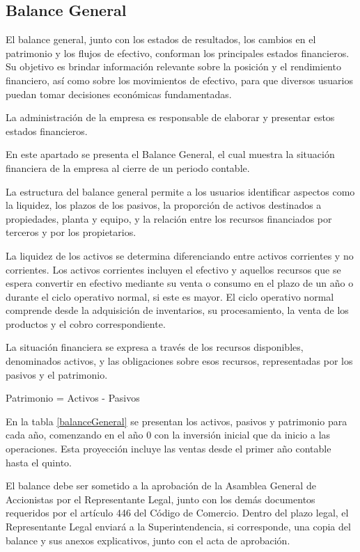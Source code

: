 \subsection{Balance General}

El balance general, junto con los estados de resultados, los cambios en el patrimonio y los flujos de efectivo, conforman los principales estados financieros. Su objetivo es brindar información relevante sobre la posición y el rendimiento financiero, así como sobre los movimientos de efectivo, para que diversos usuarios puedan tomar decisiones económicas fundamentadas.

La administración de la empresa es responsable de elaborar y presentar estos estados financieros.

En este apartado se presenta el Balance General, el cual muestra la situación financiera de la empresa al cierre de un periodo contable.

La estructura del balance general permite a los usuarios identificar aspectos como la liquidez, los plazos de los pasivos, la proporción de activos destinados a propiedades, planta y equipo, y la relación entre los recursos financiados por terceros y por los propietarios.

La liquidez de los activos se determina diferenciando entre activos corrientes y no corrientes. Los activos corrientes incluyen el efectivo y aquellos recursos que se espera convertir en efectivo mediante su venta o consumo en el plazo de un año o durante el ciclo operativo normal, si este es mayor. El ciclo operativo normal comprende desde la adquisición de inventarios, su procesamiento, la venta de los productos y el cobro correspondiente.

La situación financiera se expresa a través de los recursos disponibles, denominados activos, y las obligaciones sobre esos recursos, representadas por los pasivos y el patrimonio.

\begin{center}
    Patrimonio = Activos - Pasivos
\end{center}

En la tabla \ref{balanceGeneral} se presentan los activos, pasivos y patrimonio para cada año, comenzando en el año 0 con la inversión inicial que da inicio a las operaciones. Esta proyección incluye las ventas desde el primer año contable hasta el quinto.

El balance debe ser sometido a la aprobación de la Asamblea General de Accionistas por el Representante Legal, junto con los demás documentos requeridos por el artículo 446 del Código de Comercio. Dentro del plazo legal, el Representante Legal enviará a la Superintendencia, si corresponde, una copia del balance y sus anexos explicativos, junto con el acta de aprobación.


